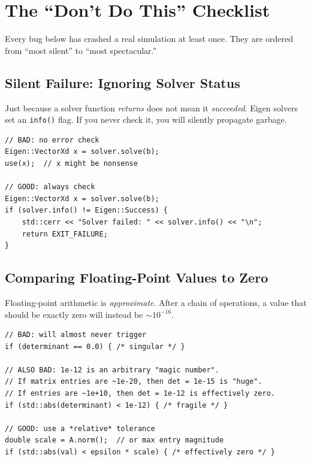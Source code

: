 \section{The ``Don't Do This'' Checklist}
\label{sec:pitfalls}

Every bug below has crashed a real simulation at least once.
They are ordered from ``most silent'' to ``most spectacular.''

\subsection{Silent Failure: Ignoring Solver Status}

\begin{warningbox}
Just because a solver function \emph{returns} does not mean it
\emph{succeeded}.  Eigen solvers set an \texttt{info()} flag.
If you never check it, you will silently propagate garbage.
\end{warningbox}

\begin{lstlisting}
// BAD: no error check
Eigen::VectorXd x = solver.solve(b);
use(x);  // x might be nonsense

// GOOD: always check
Eigen::VectorXd x = solver.solve(b);
if (solver.info() != Eigen::Success) {
    std::cerr << "Solver failed: " << solver.info() << "\n";
    return EXIT_FAILURE;
}
\end{lstlisting}

\subsection{Comparing Floating-Point Values to Zero}

Floating-point arithmetic is \emph{approximate}.  After a chain of
operations, a value that should be exactly zero will instead be
$\sim 10^{-16}$.

\begin{lstlisting}
// BAD: will almost never trigger
if (determinant == 0.0) { /* singular */ }

// ALSO BAD: 1e-12 is an arbitrary "magic number".
// If matrix entries are ~1e-20, then det = 1e-15 is "huge".
// If entries are ~1e+10, then det = 1e-12 is effectively zero.
if (std::abs(determinant) < 1e-12) { /* fragile */ }

// GOOD: use a *relative* tolerance
double scale = A.norm();  // or max entry magnitude
if (std::abs(val) < epsilon * scale) { /* effectively zero */ }
\end{lstlisting}

